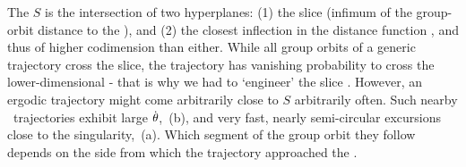 \documentclass[preprint,12pt]{elsarticle} %
\begin{document}
The {\sset} $S$ is the intersection of two hyperplanes: (1) the slice
(infimum of the group-orbit distance to the {\template}), and (2) the
closest inflection in the distance function , and thus
of higher codimension than either. While all group orbits of a  generic
trajectory cross the slice, the trajectory has vanishing probability to
cross the lower-dimensional {\sset} - that is why we had to `engineer'
the slice . However, an ergodic trajectory  might come
arbitrarily close to  $S$ arbitrarily often.
Such nearby \reducedsp\ trajectories exhibit large {\angVels} $\dot{{\bf \theta}}$,
\,(b), and very fast, nearly semi-circular
excursions close to the singularity, \,(a). Which segment
of the group orbit they follow depends on the side from which the
trajectory approached the {\sset}.
\end{document}
